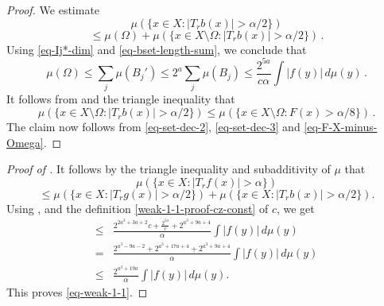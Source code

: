 \begin{proof}
    We estimate
    \begin{equation*}
        \mu\left(\{x\in X: |T_r b(x)|>\alpha/2\}\right)
    \end{equation*}
    \begin{equation}
        \label{eq-set-dec-2}
        \le \mu (\Omega) +  \mu\left(\{x\in X\setminus\Omega: |T_r b(x)|>{\alpha}/2\}\right)\,.
    \end{equation}
    Using \eqref{eq-Ij*-dim} and \eqref{eq-bset-length-sum}, we conclude that
    \begin{equation}
        \label{eq-omega-bd}
        \mu(\Omega) \le \sum_{j} \mu (B_j')
        \le 2^{a} \sum_{j} \mu(B_j) \le \frac{2^{5a}}{c\alpha} \int |f(y)|\, d\mu(y)\,.
    \end{equation}
    It follows from  and the triangle inequality that
    \begin{equation}
        \label{eq-set-dec-3}
        \mu({\{x\in X\setminus\Omega: |T_r b(x)|>\alpha/2\}}) \le \mu(\{x\in X\setminus\Omega: F(x)> \alpha/8\})\,.
    \end{equation}
    The claim now follows from \eqref{eq-set-dec-2}, \eqref{eq-set-dec-3} and \eqref{eq-F-X-minus-Omega}.
\end{proof}

\begin{proof}[Proof of ]
It follows by the triangle inequality and subadditivity of $\mu$ that
\begin{equation*}
    \mu\left(\{x\in X: |T_r f(x)|>\alpha\}\right)
\end{equation*}
\begin{equation*}
\label{eq-set-dec-1}
 \le \mu\left(\{x\in X: |T_r g(x)|>{\alpha}/2\}\right) +  \mu\left(\{x\in X: |T_r b(x)|>{\alpha}/2\}\right).
\end{equation*}
Using ,  and the definition \eqref{weak-1-1-proof-cz-const} of $c$, we get
\begin{align*}
    \le& \frac{2^{2a^3+3a+2}c + \frac{2^{5a}}{c} + 2^{a^3+9a+4}}{\alpha} \int |f(y)|\, d\mu(y) \\
    =& \frac{2^{a^3-9a-2} + 2^{a^3+17a+4} + 2^{a^3+9a+4}}{\alpha} \int |f(y)|\, d\mu(y) \\
    \le& \frac{2^{a^3 + 19a}}{\alpha} \int |f(y)|\, d\mu(y).
\end{align*}
This proves \eqref{eq-weak-1-1}.
\end{proof}





